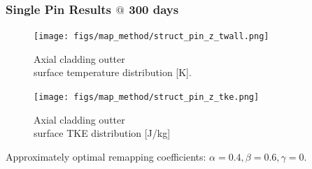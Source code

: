 \documentclass[t, pdftex]{beamer}
\begin{document}
\begin{frame}
\frametitle{Single Pin Results $@$ 300 days}
    \begin{figure}
        \centering
        \begin{minipage}{.5\textwidth}
            \centering
            \texttt{[image: figs/map\_method/struct\_pin\_z\_twall.png]}
            \caption{Axial cladding outter \\ surface temperature distribution [K].}
        \end{minipage}%
        \begin{minipage}{.5\textwidth}
            \centering
            \texttt{[image: figs/map\_method/struct\_pin\_z\_tke.png]}
            \caption{ Axial cladding outter \\ surface TKE distribution [J/kg]}
        \end{minipage}
    \end{figure}
Approximately optimal remapping coefficients: $\alpha=0.4, \beta=0.6, \gamma=0$.  
\end{frame}


\end{document}
